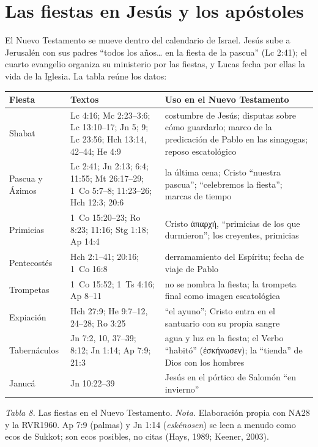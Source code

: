 \documentclass[11pt,letterpaper]{article}
\newcommand{\grc}[1]{\foreignlanguage{ancientgreek}{#1}}
\begin{document}
\section{Las fiestas en Jesús y los apóstoles}\label{sec:nt}

El Nuevo Testamento se mueve dentro del calendario de Israel. Jesús sube a Jerusalén con sus padres ``todos los años\ldots{} en la fiesta de la pascua'' (Lc 2:41); el cuarto evangelio organiza su ministerio por las fiestas, y Lucas fecha por ellas la vida de la Iglesia. La tabla reúne los datos:

\begin{center}\small\renewcommand{\arraystretch}{1.18}
\begin{tabular}{@{}L{2.6cm}L{5.4cm}L{7.2cm}@{}}
\toprule
\textbf{Fiesta} & \textbf{Textos} & \textbf{Uso en el Nuevo Testamento} \\ \midrule
Shabat & Lc 4:16; Mc 2:23--3:6; Lc 13:10--17; Jn 5; 9; Lc 23:56; Hch 13:14, 42--44; He 4:9 & costumbre de Jesús; disputas sobre cómo guardarlo; marco de la predicación de Pablo en las sinagogas; reposo escatológico \\
Pascua y Ázimos & Lc 2:41; Jn 2:13; 6:4; 11:55; Mt 26:17--29; 1~Co 5:7--8; 11:23--26; Hch 12:3; 20:6 & la última cena; Cristo ``nuestra pascua''; ``celebremos la fiesta''; marcas de tiempo \\
Primicias & 1~Co 15:20--23; Ro 8:23; 11:16; Stg 1:18; Ap 14:4 & Cristo \grc{ἀπαρχή}, ``primicias de los que durmieron''; los creyentes, primicias \\
Pentecostés & Hch 2:1--41; 20:16; 1~Co 16:8 & derramamiento del Espíritu; fecha de viaje de Pablo \\
Trompetas & 1~Co 15:52; 1~Ts 4:16; Ap 8--11 & no se nombra la fiesta; la trompeta final como imagen escatológica \\
Expiación & Hch 27:9; He 9:7--12, 24--28; Ro 3:25 & ``el ayuno''; Cristo entra en el santuario con su propia sangre \\
Tabernáculos & Jn 7:2, 10, 37--39; 8:12; Jn 1:14; Ap 7:9; 21:3 & agua y luz en la fiesta; el Verbo ``habitó'' (\grc{ἐσκήνωσεν}); la ``tienda'' de Dios con los hombres \\
Janucá & Jn 10:22--39 & Jesús en el pórtico de Salomón ``en invierno'' \\
\bottomrule
\end{tabular}\par
{\footnotesize\color{sepia}\textit{Tabla 8.} Las fiestas en el Nuevo Testamento. \textit{Nota.} Elaboración propia con NA28 y la RVR1960. Ap 7:9 (palmas) y Jn 1:14 (\emph{eskénosen}) se leen a menudo como ecos de Sukkot; son ecos posibles, no citas (Hays, 1989; Keener, 2003).}
\end{center}
\end{document}
